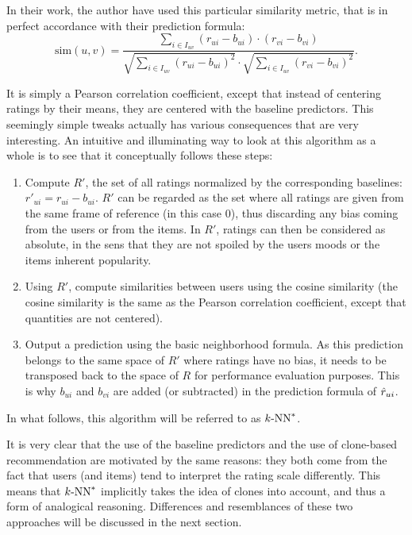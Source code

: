 In their work, the author have used this particular similarity metric, that is
in perfect accordance with their prediction formula:
$$\text{sim}(u, v) = \frac
{ \sum\limits_{i \in I_{uv}} (r_{ui} -  b_{ui}) \cdot (r_{vi} - b_{vi})}
{\sqrt{\sum\limits_{i \in I_{uv}} (r_{ui} -  b_{ui})^2} \cdot
\sqrt{\sum\limits_{i \in I_{uv}} (r_{vi} -  b_{vi})^2}}.$$

It is simply a Pearson correlation coefficient, except that instead of
centering ratings by their means, they are centered with the baseline
predictors. This seemingly simple tweaks actually has various consequences that
are very interesting. An intuitive and illuminating way to look at this
algorithm as a whole is to see that it conceptually follows these steps:
\begin{enumerate}
  \item Compute $R'$, the set of all ratings normalized by the corresponding
    baselines: $r'_{ui} = r_{ui} - b_{ui}$.  $R'$ can be regarded as the set
    where all ratings are given from the same frame of reference (in this case
    $0$), thus
    discarding any bias coming from the users or from the items. In $R'$,
    ratings can then be considered as absolute, in the sens that they are not
    spoiled by the users moods or the items inherent popularity.
  \item Using $R'$, compute similarities between users using the cosine
    similarity (the cosine similarity is the same as the Pearson correlation
    coefficient, except that quantities are not centered).
  \item Output a prediction using the basic neighborhood formula. As this
    prediction belongs to the same space of $R'$ where ratings have no bias, it
    needs to be transposed back to the space of $R$ for performance evaluation
    purposes. This is why $b_{ui}$ and $b_{vi}$ are added (or subtracted) in
    the prediction formula of $\hat{r}_{ui}$.
\end{enumerate}
\noindent
In what follows, this algorithm will be referred to as $k\text{-NN}^*$.

It is very clear that the use of the baseline predictors and the use of
clone-based recommendation are motivated by the same reasons: they both come
from the fact that users (and items) tend to interpret the rating scale
differently.  This means that $k\text{-NN}^*$ implicitly takes the idea of clones into
account, and thus a form of analogical reasoning.  Differences and resemblances
of these two approaches will be discussed in the next section.

